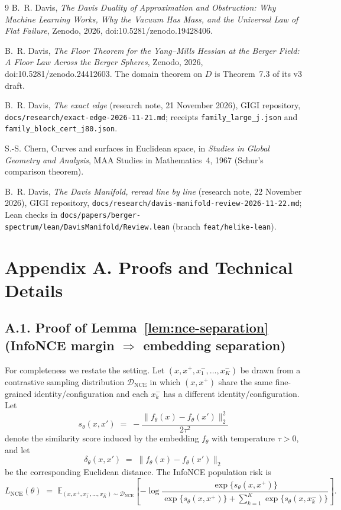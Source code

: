 \documentclass[11pt]{article}
\theoremstyle{remark}
\theoremstyle{plain}
\begin{document}
\begin{thebibliography}{9}
B.~R. Davis, \emph{The Davis Duality of Approximation and Obstruction: Why Machine Learning Works, Why the
Vacuum Has Mass, and the Universal Law of Flat Failure}, Zenodo, 2026, doi:10.5281/zenodo.19428406.

B.~R. Davis, \emph{The Floor Theorem for the Yang--Mills Hessian at the Berger Field: A Floor Law Across the Berger Spheres}, Zenodo, 2026,
doi:10.5281/zenodo.24412603. The domain theorem on $D$ is Theorem~7.3 of its v3 draft.

B.~R. Davis, \emph{The exact edge} (research note, 21 November 2026), GIGI repository,
\texttt{docs/research/exact-edge-2026-11-21.md}; receipts \texttt{family\_large\_j.json} and
\texttt{family\_block\_cert\_j80.json}.

S.-S. Chern, Curves and surfaces in Euclidean space, in \emph{Studies in Global Geometry and Analysis},
MAA Studies in Mathematics~4, 1967 (Schur's comparison theorem).

B.~R. Davis, \emph{The Davis Manifold, reread line by line} (research note, 22 November 2026), GIGI repository,
\texttt{docs/research/davis-manifold-review-2026-11-22.md}; Lean checks in
\texttt{docs/papers/berger-spectrum/lean/DavisManifold/Review.lean} (branch \texttt{feat/helike-lean}).
\end{thebibliography}

\section*{Appendix A. Proofs and Technical Details}

\subsection*{A.1. Proof of Lemma~\ref{lem:nce-separation} (InfoNCE margin $\Rightarrow$ embedding separation)}

For completeness we restate the setting. Let $(x,x^{+},x_1^{-},\dots,x_K^{-})$ be drawn from a
contrastive sampling distribution $\mathcal{D}_{\mathrm{NCE}}$ in which $(x,x^{+})$ share the same
fine-grained identity/configuration and each $x_k^{-}$ has a different identity/configuration.  
Let
\[
s_\theta(x,x') \;=\; -\frac{\|f_\theta(x)-f_\theta(x')\|_2^2}{2\tau^2}
\]
denote the similarity score induced by the embedding $f_\theta$ with temperature $\tau>0$, and
let
\[
\delta_\theta(x,x') \;=\; \|f_\theta(x)-f_\theta(x')\|_2
\]
be the corresponding Euclidean distance. The InfoNCE population risk is
\[
L_{\mathrm{NCE}}(\theta)
\;=\;
\mathbb{E}_{(x,x^{+},x_1^{-},\dots,x_K^{-})\sim\mathcal{D}_{\mathrm{NCE}}}
\left[
-\log \frac{\exp\{s_\theta(x,x^{+})\}}
        {\exp\{s_\theta(x,x^{+})\} + \sum_{k=1}^K \exp\{s_\theta(x,x_k^{-})\}}
\right].
\]
\end{document}
